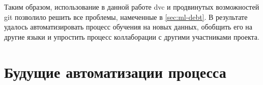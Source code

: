 Таким образом, использование в данной работе \gls{dvc} и продвинутых возможностей \gls{git} позволило решить все проблемы, намеченные в \ref{sec:ml-debt}.
В результате удалось автоматизировать процесс обучения на новых данных, обобщить его на другие языки и упростить процесс коллаборации с другими участниками проекта.
\section{Будущие автоматизации процесса}
\label{sec:future}
